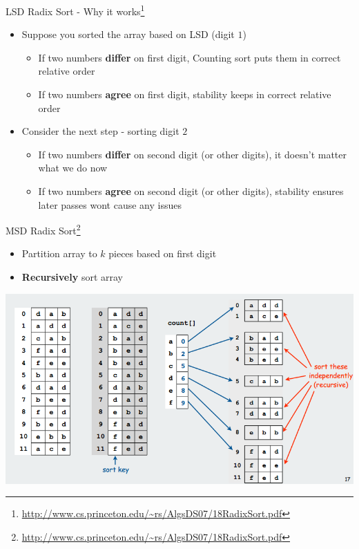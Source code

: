 \documentclass{beamer}
\begin{document}
\begin{frame}{LSD Radix Sort - Why it works\footnote{\url{http://www.cs.princeton.edu/~rs/AlgsDS07/18RadixSort.pdf}}}
\begin{itemize}
\item Suppose you sorted the array based on LSD (digit $1$)
\begin{itemize}
    \item If two numbers {\bf differ} on first digit, Counting sort puts them in correct relative order
    \item If two numbers {\bf agree} on first digit, stability keeps in correct relative order
\end{itemize}
\item Consider the next step - sorting digit $2$ 
\begin{itemize}
    \item If two numbers {\bf differ} on second digit (or other digits), it doesn't matter what we do now
    \item If two numbers {\bf agree} on second digit (or other digits), stability ensures later passes wont cause any issues
\end{itemize}
\end{itemize}
\end{frame}


\begin{frame}{MSD Radix Sort\footnote{\url{http://www.cs.princeton.edu/~rs/AlgsDS07/18RadixSort.pdf}}}
\begin{itemize}
\item Partition array to $k$ pieces based on first digit
\item {\bf Recursively} sort array 
\end{itemize}
\begin{center}
    \includegraphics[scale=0.35]{msdRadixSortEg.png}
\end{center}
\end{frame}
\end{document}
